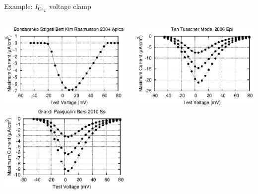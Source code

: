 \documentclass[t,xcolor={usenames,dvipsnames}]{beamer}
\begin{document}
\begin{frame}{Example: $I_{\textrm{Ca}_L}$ voltage clamp}
\begin{columns}[T]
\begin{column}{.33\linewidth}
\begin{center}
\includegraphics[width=\textwidth]{bondarenko_szigeti_bett_kim_rasmusson_2004_apical_ICaL_IV_curve}\\
\vspace{.1cm}
\includegraphics[width=\textwidth]{grandi_pasqualini_bers_2010_ss_ICaL_IV_curve}
\end{center}
\end{column}
\begin{column}{.33\linewidth}
\begin{center}
\includegraphics[width=\textwidth]{ten_tusscher_model_2006_epi_ICaL_IV_curve}\\

\end{center}
\end{column}
\end{columns}
\end{frame}
\end{document}
